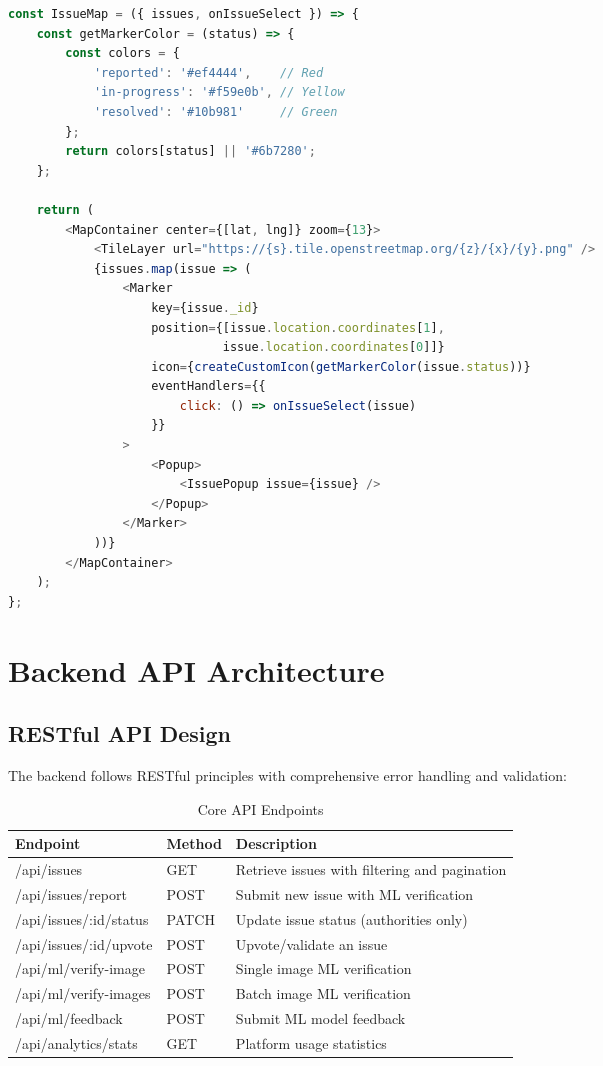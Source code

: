 \documentclass[12pt,a4paper]{article}
\begin{document}
\begin{lstlisting}[language=JavaScript, caption=Interactive Map Component]
const IssueMap = ({ issues, onIssueSelect }) => {
    const getMarkerColor = (status) => {
        const colors = {
            'reported': '#ef4444',    // Red
            'in-progress': '#f59e0b', // Yellow
            'resolved': '#10b981'     // Green
        };
        return colors[status] || '#6b7280';
    };
    
    return (
        <MapContainer center={[lat, lng]} zoom={13}>
            <TileLayer url="https://{s}.tile.openstreetmap.org/{z}/{x}/{y}.png" />
            {issues.map(issue => (
                <Marker
                    key={issue._id}
                    position={[issue.location.coordinates[1], 
                              issue.location.coordinates[0]]}
                    icon={createCustomIcon(getMarkerColor(issue.status))}
                    eventHandlers={{
                        click: () => onIssueSelect(issue)
                    }}
                >
                    <Popup>
                        <IssuePopup issue={issue} />
                    </Popup>
                </Marker>
            ))}
        </MapContainer>
    );
};
\end{lstlisting}

\section{Backend API Architecture}

\subsection{RESTful API Design}

The backend follows RESTful principles with comprehensive error handling and validation:

\begin{table}[h]
\centering
\begin{tabular}{@{}llp{6cm}@{}}
\toprule
\textbf{Endpoint} & \textbf{Method} & \textbf{Description} \\
\midrule
/api/issues & GET & Retrieve issues with filtering and pagination \\
/api/issues/report & POST & Submit new issue with ML verification \\
/api/issues/:id/status & PATCH & Update issue status (authorities only) \\
/api/issues/:id/upvote & POST & Upvote/validate an issue \\
/api/ml/verify-image & POST & Single image ML verification \\
/api/ml/verify-images & POST & Batch image ML verification \\
/api/ml/feedback & POST & Submit ML model feedback \\
/api/analytics/stats & GET & Platform usage statistics \\
\bottomrule
\end{tabular}
\caption{Core API Endpoints}
\end{table}
\end{document}
